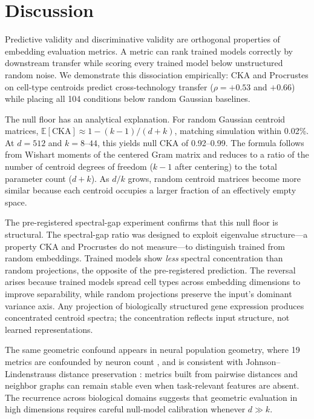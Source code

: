 \documentclass[11pt]{article}
\begin{document}
\section{Discussion}
\label{sec:discussion}

Predictive validity and discriminative validity are orthogonal
properties of embedding evaluation metrics. A metric can rank trained
models correctly by downstream transfer while scoring every trained
model below unstructured random noise. We demonstrate this dissociation
empirically: CKA and Procrustes on cell-type centroids predict
cross-technology transfer ($\rho = +0.53$ and $+0.66$) while placing
all 104 conditions below random Gaussian baselines.

The null floor has an analytical explanation. For random Gaussian
centroid matrices, $\mathbb{E}[\mathrm{CKA}] \approx 1 - (k{-}1)/
(d{+}k)$, matching simulation within 0.02\%. At $d = 512$ and
$k = 8$--$44$, this yields null CKA of 0.92--0.99. The formula
follows from Wishart moments of the centered Gram matrix and reduces
to a ratio of the number of centroid degrees of freedom ($k - 1$
after centering) to the total parameter count ($d + k$). As $d/k$
grows, random centroid matrices become more similar because each
centroid occupies a larger fraction of an effectively empty space.

The pre-registered spectral-gap experiment confirms that this null
floor is structural. The spectral-gap ratio was designed to exploit
eigenvalue structure---a property CKA and Procrustes do not
measure---to distinguish trained from random embeddings. Trained
models show \emph{less} spectral concentration than random
projections, the opposite of the pre-registered prediction. The
reversal arises because trained models spread cell types across
embedding dimensions to improve separability, while random projections
preserve the input's dominant variance axis. Any projection of
biologically structured gene expression produces concentrated centroid
spectra; the concentration reflects input structure, not learned
representations.

The same geometric confound appears in neural population geometry, where
19 metrics are confounded by neuron count \citep{tower2026bracket}, and
is consistent with Johnson--Lindenstrauss distance preservation
\citep{johnsonlindenstrauss1984}: metrics built from pairwise distances
and neighbor graphs can remain stable even when task-relevant features
are absent. The recurrence across biological domains suggests that
geometric evaluation in high dimensions requires careful null-model
calibration whenever $d \gg k$.
\end{document}
